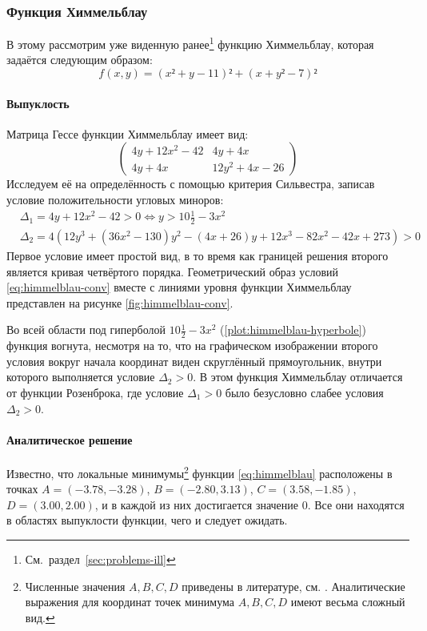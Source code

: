 \subsubsection{Функция Химмельблау}
\label{sec:himmelblau}

В этому рассмотрим уже виденную
ранее\footnote{См. раздел \ref{sec:problems-ill}} функцию Химмельблау,
которая задаётся следующим образом:
\begin{equation}
  \label{eq:himmelblau}
  \tag{$\chi$-\theequation}
  f(x, y) = (x² + y - 11)² + (x + y² - 7)²
\end{equation}

\paragraph{Выпуклость}

Матрица Гессе функции Химмельблау имеет вид:
\begin{equation}
  \label{eq:himmelblau-hess}
  \begin{pmatrix}
    4y+12x^2-42 & 4y+4x\\
    4y+4x & 12y^2+4x-26
  \end{pmatrix}
\end{equation}
Исследуем её на определённость с помощью критерия Сильвестра, записав
условие положительности угловых миноров:
\begin{align}
  \label{eq:himmelblau-conv}
  &\Delta_1 = 4y+12x^2-42 > 0 \iff y > 10\frac{1}{2}-3x^2 \\
  &\Delta_2 =
  4\left(12y^3+(36x^2-130)y^2-(4x+26)y+12x^3-82x^2-42x+273\right) > 0
\end{align}
Первое условие имеет простой вид, в то время как границей решения
второго является кривая четвёртого порядка. Геометрический образ
условий \eqref{eq:himmelblau-conv} вместе с линиями уровня функции
Химмельблау представлен на рисунке \ref{fig:himmelblau-conv}. 

Во всей области под гиперболой $10\frac{1}{2}-3x^2$
(\ref{plot:himmelblau-hyperbole}) функция вогнута, несмотря на то, что
на графическом изображении второго условия вокруг начала координат
виден скруглённый прямоугольник, внутри которого выполняется условие
$\Delta_2>0$. В этом функция Химмельблау отличается от функции
Розенброка, где условие $\Delta_1>0$ было безусловно слабее условия
$\Delta_2>0$.

\paragraph{Аналитическое решение}
Известно, что локальные минимумы\footnote{Численные значения $A, B, C,
  D$ приведены в литературе, см. \cite{himmelblau75}. Аналитические
  выражения для координат точек минимума $A,B,C,D$ имеют весьма
  сложный вид.} функции \eqref{eq:himmelblau} расположены в точках
$A=(-3.78, -3.28)$, $B=(-2.80, 3.13)$, $C=(3.58, -1.85)$,
\mbox{$D=(3.00, 2.00)$}, и в каждой из них достигается значение $0$.
Все они находятся в областях выпуклости функции, чего и следует
ожидать.

